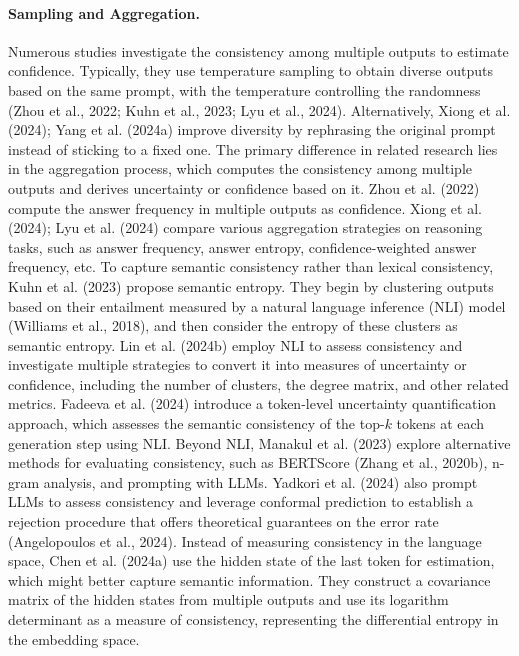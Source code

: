 \paragraph{Sampling and Aggregation.} Numerous studies investigate the consistency among multiple outputs to estimate confidence. Typically, they use temperature sampling to obtain diverse outputs based on the same prompt, with the temperature controlling the randomness (Zhou et al., 2022; Kuhn et al., 2023; Lyu et al., 2024). Alternatively, Xiong et al. (2024); Yang et al. (2024a) improve diversity by rephrasing the original prompt instead of sticking to a fixed one. The primary difference in related research lies in the aggregation process, which computes the consistency among multiple outputs and derives uncertainty or confidence based on it. Zhou et al. (2022) compute the answer frequency in multiple outputs as confidence. Xiong et al. (2024); Lyu et al. (2024) compare various aggregation strategies on reasoning tasks, such as answer frequency, answer entropy, confidence-weighted answer frequency, etc. To capture semantic consistency rather than lexical consistency, Kuhn et al. (2023) propose semantic entropy. They begin by clustering outputs based on their entailment measured by a natural language inference (NLI) model (Williams et al., 2018), and then consider the entropy of these clusters as semantic entropy. Lin et al. (2024b) employ NLI to assess consistency and investigate multiple strategies to convert it into measures of uncertainty or confidence, including the number of clusters, the degree matrix, and other related metrics. Fadeeva et al. (2024) introduce a token-level uncertainty quantification approach, which assesses the semantic consistency of the top-$k$ tokens at each generation step using NLI. Beyond NLI, Manakul et al. (2023) explore alternative methods for evaluating consistency, such as BERTScore (Zhang et al., 2020b), n-gram analysis, and prompting with LLMs. Yadkori et al. (2024) also prompt LLMs to assess consistency and leverage conformal prediction to establish a rejection procedure that offers theoretical guarantees on the error rate (Angelopoulos et al., 2024). Instead of measuring consistency in the language space, Chen et al. (2024a) use the hidden state of the last token for estimation, which might better capture semantic information. They construct a covariance matrix of the hidden states from multiple outputs and use its logarithm determinant as a measure of consistency, representing the differential entropy in the embedding space.

